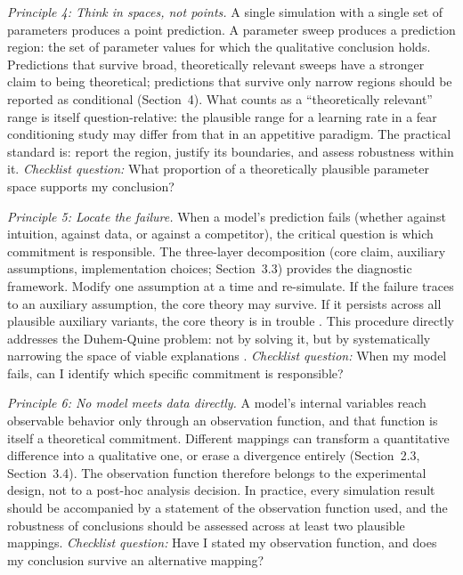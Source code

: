 \documentclass[fleqn,10pt]{wlscirep}
\begin{document}
\begin{linenumbers}
\emph{Principle 4: Think in spaces, not points.} A single simulation with a single set of parameters produces a point prediction. A parameter sweep produces a prediction region: the set of parameter values for which the qualitative conclusion holds. Predictions that survive broad, theoretically relevant sweeps have a stronger claim to being theoretical; predictions that survive only narrow regions should be reported as conditional (Section~4). What counts as a ``theoretically relevant'' range is itself question-relative: the plausible range for a learning rate in a fear conditioning study may differ from that in an appetitive paradigm. The practical standard is: report the region, justify its boundaries, and assess robustness within it. \emph{Checklist question:} What proportion of a theoretically plausible parameter space supports my conclusion?

\emph{Principle 5: Locate the failure.} When a model's prediction fails (whether against intuition, against data, or against a competitor), the critical question is which commitment is responsible. The three-layer decomposition (core claim, auxiliary assumptions, implementation choices; Section~3.3) provides the diagnostic framework. Modify one assumption at a time and re-simulate. If the failure traces to an auxiliary assumption, the core theory may survive. If it persists across all plausible auxiliary variants, the core theory is in trouble \citep{miller1995assessment}. This procedure directly addresses the Duhem-Quine problem: not by solving it, but by systematically narrowing the space of viable explanations \citep{duhem1954aim, lakatos1970falsification}. \emph{Checklist question:} When my model fails, can I identify which specific commitment is responsible?

\emph{Principle 6: No model meets data directly.} A model's internal variables reach observable behavior only through an observation function, and that function is itself a theoretical commitment. Different mappings can transform a quantitative difference into a qualitative one, or erase a divergence entirely (Section~2.3, Section~3.4). The observation function therefore belongs to the experimental design, not to a post-hoc analysis decision. In practice, every simulation result should be accompanied by a statement of the observation function used, and the robustness of conclusions should be assessed across at least two plausible mappings. \emph{Checklist question:} Have I stated my observation function, and does my conclusion survive an alternative mapping?


\end{linenumbers}
\end{document}
